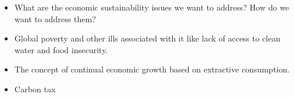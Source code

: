 \documentclass[12pt]{article}
\begin{document}
\begin{itemize}
\item{What are the economic sustainability issues we want to address? How do we want to address them?}
\item{Global poverty and other ills associated with it like lack of access to clean water and food insecurity.}
\item{The concept of continual economic growth based on extractive consumption.}
\item{Carbon tax}
\end{itemize}
%
%
%


\end{document}
